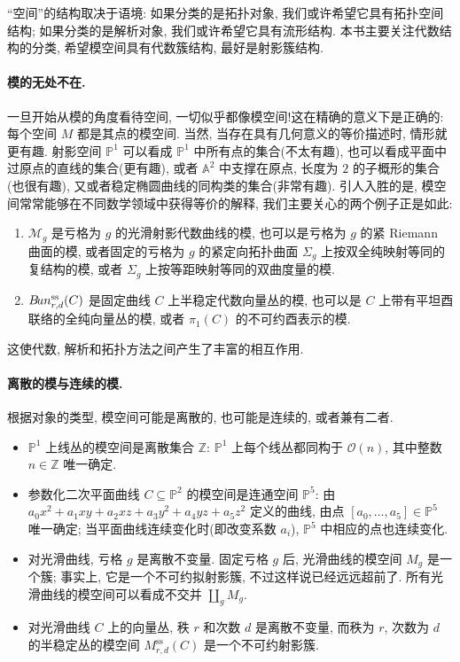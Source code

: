 ``空间''的结构取决于语境: 如果分类的是拓扑对象, 我们或许希望它具有拓扑空间结构; 如果分类的是解析对象, 我们或许希望它具有流形结构. 本书主要关注代数结构的分类, 希望模空间具有代数簇结构, 最好是射影簇结构.

\paragraph*{模的无处不在.} 一旦开始从模的角度看待空间, 一切似乎都像模空间!这在精确的意义下是正确的: 每个空间 $M$ 都是其点的模空间. 当然, 当存在具有几何意义的等价描述时, 情形就更有趣. 射影空间 $\mathbb P^1$ 可以看成 $\mathbb P^1$ 中所有点的集合(不太有趣), 也可以看成平面中过原点的直线的集合(更有趣), 或者 $\mathbb A^2$ 中支撑在原点, 长度为 $2$ 的子概形的集合(也很有趣), 又或者稳定椭圆曲线的同构类的集合(非常有趣). 引人入胜的是, 模空间常常能够在不同数学领域中获得等价的解释, 我们主要关心的两个例子正是如此: 
\begin{enumerate}[(1)]
\item $\mathcal M_g$ 是亏格为 $g$ 的光滑射影代数曲线的模, 也可以是亏格为 $g$ 的紧 Riemann 曲面的模, 或者固定的亏格为 $g$ 的紧定向拓扑曲面 $\Sigma_g$ 上按双全纯映射等同的复结构的模, 或者 $\Sigma_g$ 上按等距映射等同的双曲度量的模.
\item $B\!un_{r,d}^{\mathrm{ss}}(C)$ 是固定曲线 $C$ 上半稳定代数向量丛的模, 也可以是 $C$ 上带有平坦酉联络的全纯向量丛的模, 或者 $\pi_1(C)$ 的不可约酉表示的模.
\end{enumerate}
这使代数, 解析和拓扑方法之间产生了丰富的相互作用.

\paragraph*{离散的模与连续的模.} 根据对象的类型, 模空间可能是离散的, 也可能是连续的, 或者兼有二者.
\begin{itemize}
\item $\mathbb P^1$ 上线丛的模空间是离散集合 $\mathbb Z$: $\mathbb P^1$ 上每个线丛都同构于 $\mathcal O(n)$, 其中整数 $n\in\mathbb Z$ 唯一确定.
\item 参数化二次平面曲线 $C\subseteq\mathbb P^2$ 的模空间是连通空间 $\mathbb P^5$: 由 $a_0x^2+a_1xy+a_2xz+a_3y^2+a_4yz+a_5z^2$ 定义的曲线, 由点 $[a_0,\ldots,a_5]\in\mathbb P^5$ 唯一确定; 当平面曲线连续变化时(即改变系数 $a_i$), $\mathbb P^5$ 中相应的点也连续变化.
\item 对光滑曲线, 亏格 $g$ 是离散不变量. 固定亏格 $g$ 后, 光滑曲线的模空间 $M_g$ 是一个簇; 事实上, 它是一个不可约拟射影簇, 不过这样说已经远远超前了. 所有光滑曲线的模空间可以看成不交并 $\coprod_g M_g$.
\item 对光滑曲线 $C$ 上的向量丛, 秩 $r$ 和次数 $d$ 是离散不变量, 而秩为 $r$, 次数为 $d$ 的半稳定丛的模空间 $M_{r,d}^{\mathrm{ss}}(C)$ 是一个不可约射影簇.
\end{itemize}

